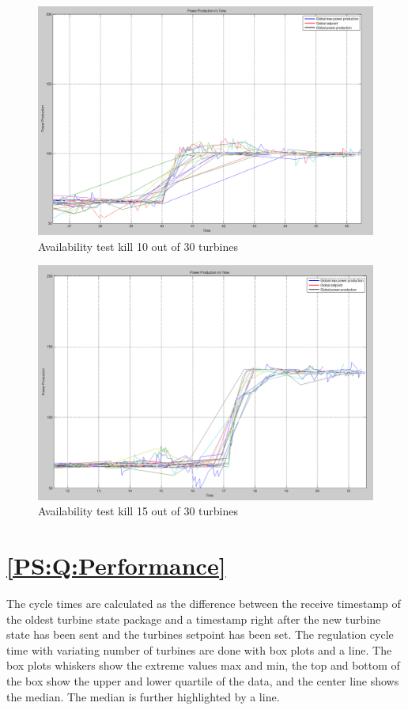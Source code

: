 \begin{figure}
	\centering
	\includegraphics[width=\resultsFigureWidthScale\textwidth]{figures/Results/availabilitytest30-20_setpoint_2000.PNG}
	\caption{Availability test kill 10 out of 30 turbines}
	\label{fig:exp:availability_kill10}
\end{figure}

\begin{figure}
	\centering
	\includegraphics[width=\resultsFigureWidthScale\textwidth]{figures/Results/availabilitytest30-15_setpoint_2000.PNG}
	\caption{Availability test kill 15 out of 30 turbines}
	\label{fig:exp:availability_kill15}
\end{figure}

\clearpage
\section{\ref{PS:Q:Performance}}\FloatBarrier
\label{sec:exp:performance}
The cycle times are calculated as the difference between the receive timestamp of the oldest turbine state package and a timestamp right after the new turbine state has been sent and the turbines setpoint has been set.
The regulation cycle time with variating number of turbines are done with box plots and a line. The box plots whiskers show the extreme values max and min, the top and bottom of the box show the upper and lower quartile of the data, and the center line shows the median. The median is further highlighted by a line.

